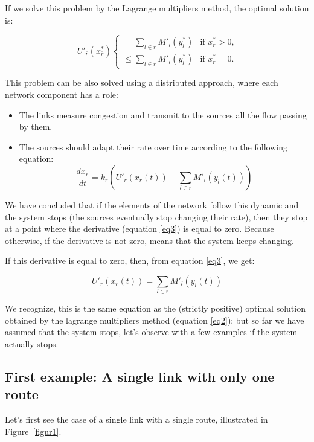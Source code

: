 If we solve this problem by the Lagrange multipliers method, the optimal solution is:

\begin{equation}
\ U'_{\bar r}(x^*_{\bar r})
\begin{cases}
= \sum_{l \in {\bar r}} M'_l(y^*_{l})  & \mbox{if } x^*_{\bar r} > 0,\\ 
\leq \sum_{l \in {\bar r}} M'_l(y^*_{l}) & \mbox{if }x^*_{\bar r} = 0.
\end{cases}
\label{eq2}
\end{equation}

This problem can be also solved using a distributed approach, where each network component has a role:
\begin{itemize}
\item The links measure congestion and transmit to the sources all the flow passing by them.
\item The sources should adapt their rate over time according to the following equation:
\begin{equation}
\frac{dx_r}{ dt}=k_r(U'_r(x_r(t)) - \sum_{l \in {r}} M'_l(y_l(t) )   )
\label{eq3}
\end{equation}
\end{itemize}

We have concluded that if the elements of the network follow this dynamic and the system stops (the sources eventually stop changing their rate), then they stop at a point where the derivative (equation \eqref{eq3}) is equal to zero. Because otherwise, if the derivative is not zero, means that the system keeps changing.

If this derivative is equal to zero, then, from equation \eqref{eq3}, we get:

\begin{equation}
U'_r(x_r(t)) = \sum_{l \in {r}} M'_l(y_l(t))
\label{eq4}
\end{equation}

We recognize, this is the same equation as the (strictly positive) optimal solution obtained by the lagrange multipliers method (equation \eqref{eq2}); but so far we have assumed that the system stops, let's observe with a few examples if the system actually stops.

\subsection{First example: A single link with only one route}

Let's first see the case of a single link with a single route, illustrated in Figure~\ref{figur1}.

